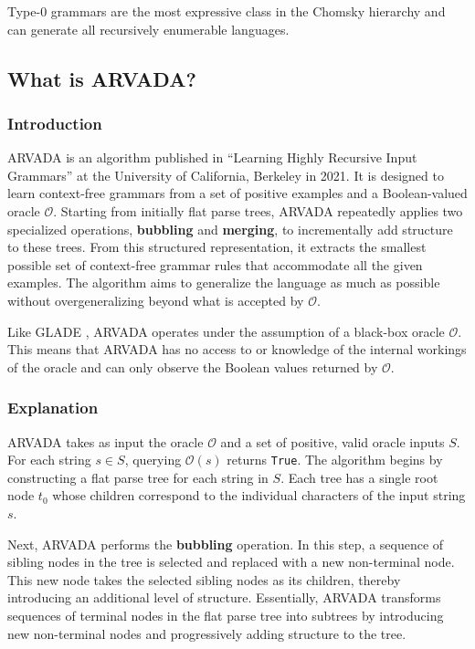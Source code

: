 Type-0 grammars are the most expressive class in the Chomsky hierarchy and can generate all recursively enumerable languages.

\subsection{What is ARVADA?}

\subsubsection{Introduction}

ARVADA is an algorithm published in \enquote{Learning Highly Recursive Input Grammars} \cite{kulkarniLearningHighlyRecursive2021} at the University of California, Berkeley in 2021. It is designed to learn context-free grammars from a set of positive examples and a Boolean-valued oracle $\mathcal{O}$. Starting from initially flat parse trees, ARVADA repeatedly applies two specialized operations, \textbf{bubbling} and \textbf{merging}, to incrementally add structure to these trees. From this structured representation, it extracts the smallest possible set of context-free grammar rules that accommodate all the given examples. The algorithm aims to generalize the language as much as possible without overgeneralizing beyond what is accepted by $\mathcal{O}$.

\vspace{\baselineskip}
Like GLADE \cite{bastaniSynthesizingProgramInput}, ARVADA operates under the assumption of a black-box oracle $\mathcal{O}$. This means that ARVADA has no access to or knowledge of the internal workings of the oracle and can only observe the Boolean values returned by $\mathcal{O}$.

\subsubsection{Explanation}

ARVADA takes as input the oracle $\mathcal{O}$ and a set of positive, valid oracle inputs $S$. For each string $s \in S$, querying $\mathcal{O}(s)$ returns \verb|True|. The algorithm begins by constructing a flat parse tree for each string in $S$. Each tree has a single root node $t_0$ whose children correspond to the individual characters of the input string $s$.

\vspace{\baselineskip}
Next, ARVADA performs the \textbf{bubbling} operation. In this step, a sequence of sibling nodes in the tree is selected and replaced with a new non-terminal node. This new node takes the selected sibling nodes as its children, thereby introducing an additional level of structure. Essentially, ARVADA transforms sequences of terminal nodes in the flat parse tree into subtrees by introducing new non-terminal nodes and progressively adding structure to the tree.

